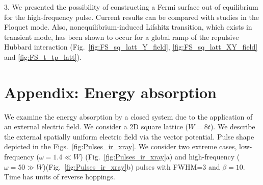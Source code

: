 3. We presented the possibility of constructing a Fermi surface out of equilibrium for the high-frequency pulse. Current results can be compared with studies in the Floquet mode. Also, nonequilibrium-induced Lifshitz transition, which exists in transient mode, has been shown to occur for a global ramp of the repulsive Hubbard interaction (Fig.~\ref{fig:FS_sq_latt_Y_field}, \ref{fig:FS_sq_latt_XY_field} and \ref{fig:FS_t_tp_latt}). 


\FloatBarrier
\section{\label{E_A}Appendix: Energy absorption}
We examine the energy absorption by a closed system due to the application of an external electric field. We consider a 2D square lattice ($W=8t$). We describe the external spatially uniform electric field via the vector potential. Pulse shape depicted in the Figs.~\ref{fig:Pulses_ir_xray}. We consider two extreme cases, low-frequency ($\omega=1.4 \ll W$) (Fig.~\ref{fig:Pulses_ir_xray}a) and high-frequency ($\omega=50 \gg W$)(Fig.~\ref{fig:Pulses_ir_xray}b) pulses with FWHM=3 and $\beta=10$. Time has units of reverse hoppings.
